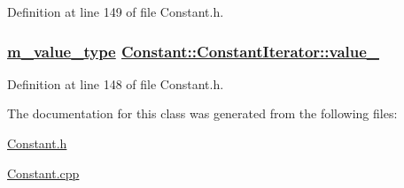 Definition at line 149 of file Constant.h.\hypertarget{classConstant_1_1ConstantIterator_r0}{
\subsubsection[value\_\-]{\setlength{\rightskip}{0pt plus 5cm}\hyperlink{Types_8h_a3}{m\_\-value\_\-type} \hyperlink{classConstant_1_1ConstantIterator_r0}{Constant::Constant\-Iterator::value\_\-}}}
\label{classConstant_1_1ConstantIterator_r0}




Definition at line 148 of file Constant.h.

The documentation for this class was generated from the following files:\begin{CompactItemize}
\item 
\hyperlink{Constant_8h}{Constant.h}\item 
\hyperlink{Constant_8cpp}{Constant.cpp}\end{CompactItemize}
